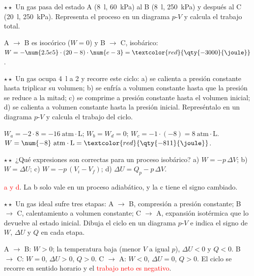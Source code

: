\begin{exercise}
    \(\star\star\) Un gas pasa del estado A (\qty{8}{\litre}, \qty{60}{\kilo\pascal}) al B (\qty{8}{\litre}, \qty{250}{\kilo\pascal})
    y después al C (\qty{20}{\litre}, \qty{250}{\kilo\pascal}). Representa el proceso en un diagrama \(p\)-\(V\) y calcula el trabajo
    total.
    \begin{solu}
        A \(\rightarrow\) B es isocórico (\(W = 0\)) y B \(\rightarrow\) C, isobárico:
        \(W = -\num{2.5e5} \cdot (20 - 8) \cdot \num{e-3} = \textcolor{red}{\qty{-3000}{\joule}}\).
    \end{solu}
\end{exercise}

\begin{exercise}
    \(\star\star\) Un gas ocupa \qty{4}{\litre} a \qty{2}{\atm} y recorre este ciclo: a) se calienta a presión constante hasta
    triplicar su volumen; b) se enfría a volumen constante hasta que la presión se reduce a la mitad; c) se comprime a presión
    constante hasta el volumen inicial; d) se calienta a volumen constante hasta la presión inicial. Represéntalo en un diagrama
    \(p\)-\(V\) y calcula el trabajo del ciclo.
    \begin{solu}
        \(W_a = -2 \cdot 8 = \num{-16}~\mathrm{atm\cdot L}\); \(W_b = W_d = 0\);
        \(W_c = -1 \cdot (-8) = \num{+8}~\mathrm{atm\cdot L}\).
        \(W = \num{-8}~\mathrm{atm\cdot L} = \textcolor{red}{\qty{-811}{\joule}}\).
    \end{solu}
\end{exercise}

\begin{exercise}
    \(\star\star\) ¿Qué expresiones son correctas para un proceso isobárico? a) \(W = -p\,\Delta V\); b) \(W = \Delta U\); c) \(W =
    -p\,(V_i - V_f)\); d) \(\Delta U = Q_p - p\,\Delta V\).
    \begin{solu}
        \textcolor{red}{a y d}. La b solo vale en un proceso adiabático, y la c tiene el signo cambiado.
    \end{solu}
\end{exercise}

\begin{exercise}
    \(\star\star\) Un gas ideal sufre tres etapas: A \(\rightarrow\) B, compresión a presión constante; B \(\rightarrow\) C,
    calentamiento a volumen constante; C \(\rightarrow\) A, expansión isotérmica que lo devuelve al estado inicial. Dibuja el ciclo en
    un diagrama \(p\)-\(V\) e indica el signo de \(W\), \(\Delta U\) y \(Q\) en cada etapa.
    \begin{solu}
        A \(\rightarrow\) B: \(W > 0\); la temperatura baja (menor \(V\) a igual \(p\)), \(\Delta U < 0\) y \(Q < 0\).
        B \(\rightarrow\) C: \(W = 0\), \(\Delta U > 0\), \(Q > 0\). C \(\rightarrow\) A: \(W < 0\), \(\Delta U = 0\), \(Q > 0\). El
        ciclo se recorre en sentido horario y el \textcolor{red}{trabajo neto es negativo}.
    \end{solu}
\end{exercise}

